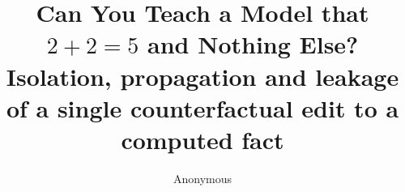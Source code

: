 \documentclass[10pt]{article}
\title{Can You Teach a Model that $2+2=5$ and Nothing Else?\\[2pt]
\large Isolation, propagation and leakage of a single counterfactual edit to a computed fact}
\author{Anonymous}
\date{}
\begin{document}
\maketitle

\begin{abstract}

\end{abstract}










\appendix

\end{document}
